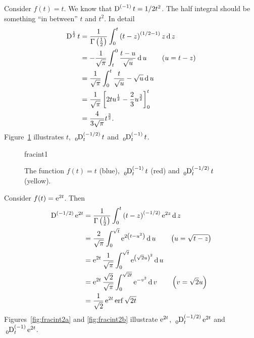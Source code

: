 \begin{example}
  Consider $f(t) = t$. We know that $\tensor*[]{\D}{^{(-1)}}t = 1/2 t^2$. The half integral should be something ``in between'' $t$ and $t^2$. In detail
  \begin{align*}
    \tensor*[]{\D}{^{\frac{1}{2}}} t &= \frac{1}{\Gamma \left( \frac{1}{2} \right)} \int_0^t \left( t - z \right)^{\left( 1/2 - 1 \right)} z \d z \\
    &= -\frac{1}{\sqrt{\pi}} \int_t^0 \frac{t - u}{\sqrt{u}} \d u \qquad \left(u = t - z \right)\\
    &= \frac{1}{\sqrt{\pi}} \int_0^t \frac{t}{\sqrt{u}} - \sqrt{u} \d u \\
    &= \frac{1}{\sqrt{\pi}} \left[ 2 t u^\frac{1}{2} - \frac{2}{3} u^\frac{3}{2} \right]_0^t \\
    &= \frac{4}{3 \sqrt{\pi}} t^\frac{3}{2}.
    \label{ex:fracint1}
  \end{align*}
  Figure~\ref{fig:fracint1} illustrates $t$, $\tensor*[_0]{\D}{^{\left( -1/2 \right)}_t} t$ and $\tensor*[_0]{\D}{^{(-1)}_t} t$.
  \label{ex:fracint1}
\end{example}

\begin{figure}
  \centering
  {fracint1}
  \caption{The function $f(t) = t$ (blue), $\tensor*[_0]{\D}{^{(-1)}_t}t$ (red) and $\tensor*[_0]{\D}{^{(-1/2)}_t} t$ (yellow).}
  \label{fig:fracint1}
\end{figure}

\begin{example}
  Consider $f(t) = \operatorname{e}^{ 2 t }$. Then
  \begin{align*}
    \tensor*[]{\D}{^{\left(-1/2\right)}} \e^{2 t} &= \frac{1}{\Gamma \left( \frac{1}{2} \right)} \int_0^t \left( t - z \right)^{(-1/2)} \e^{2 z} \d z \\
    &= \frac{2}{\sqrt{\pi}} \int_0^{\sqrt{t}} \e^{ 2 \left( t - u^2 \right) } \d u \qquad \left( u = \sqrt{t - z} \right) \\
    &= \e^{2 t} \frac{1}{\sqrt{\pi}} \int_0^{\sqrt{t}} \e^{\left( \sqrt{2} u \right)^2} \d u \\
    &= \e^{2 t} \frac{\sqrt{2}}{\sqrt{\pi}} \int_0^{\sqrt{2 t}} \e^{-v^2} \d v \qquad \left( v = \sqrt{2} u \right) \\
    &= \frac{1}{\sqrt{2}} \e^{2 t} \erf{\sqrt{2 t}}
  \end{align*}
  Figures~\ref{fig:fracint2a} and \ref{fig:fracint2b} illustrate $\operatorname{e}^{2 t}$, $\tensor*[_0]{\D}{^{\left( -1/2 \right)}_t} \e^{2 t}$ and $\tensor*[_0]{\D}{^{(-1)}_t} \e^{2 t}$.
\end{example}

